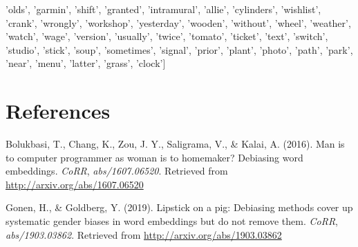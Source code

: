 \documentclass[12pt,]{book}
\newenvironment{Shaded}{\begin{snugshade}}{\end{snugshade}}
\newcommand{\StringTok}[1]{\textcolor[rgb]{0.31,0.60,0.02}{#1}}
\newcommand{\NormalTok}[1]{#1}
\begin{document}
\begin{Shaded}
\begin{Highlighting}[]
                \StringTok{'olds'}\NormalTok{, }\StringTok{'garmin'}\NormalTok{, }\StringTok{'shift'}\NormalTok{, }\StringTok{'granted'}\NormalTok{, }\StringTok{'intramural'}\NormalTok{, }\StringTok{'allie'}\NormalTok{, }\StringTok{'cylinders'}\NormalTok{,}
                \StringTok{'wishlist'}\NormalTok{, }\StringTok{'crank'}\NormalTok{, }\StringTok{'wrongly'}\NormalTok{, }\StringTok{'workshop'}\NormalTok{, }\StringTok{'yesterday'}\NormalTok{, }\StringTok{'wooden'}\NormalTok{, }
                \StringTok{'without'}\NormalTok{, }\StringTok{'wheel'}\NormalTok{, }\StringTok{'weather'}\NormalTok{, }\StringTok{'watch'}\NormalTok{, }\StringTok{'wage'}\NormalTok{, }\StringTok{'version'}\NormalTok{, }\StringTok{'usually'}\NormalTok{,}
                \StringTok{'twice'}\NormalTok{, }\StringTok{'tomato'}\NormalTok{, }\StringTok{'ticket'}\NormalTok{, }\StringTok{'text'}\NormalTok{, }\StringTok{'switch'}\NormalTok{, }\StringTok{'studio'}\NormalTok{, }\StringTok{'stick'}\NormalTok{,}
                \StringTok{'soup'}\NormalTok{, }\StringTok{'sometimes'}\NormalTok{, }\StringTok{'signal'}\NormalTok{, }\StringTok{'prior'}\NormalTok{, }\StringTok{'plant'}\NormalTok{, }\StringTok{'photo'}\NormalTok{,}
                \StringTok{'path'}\NormalTok{, }\StringTok{'park'}\NormalTok{, }\StringTok{'near'}\NormalTok{, }\StringTok{'menu'}\NormalTok{, }\StringTok{'latter'}\NormalTok{, }\StringTok{'grass'}\NormalTok{, }\StringTok{'clock'}\NormalTok{]}
\end{Highlighting}
\end{Shaded}

\normalsize

\chapter*{References}\label{references}

\hypertarget{refs}{}
\hypertarget{ref-Bolukbasi2016Man}{}
Bolukbasi, T., Chang, K., Zou, J. Y., Saligrama, V., \& Kalai, A.
(2016). Man is to computer programmer as woman is to homemaker?
Debiasing word embeddings. \emph{CoRR}, \emph{abs/1607.06520}. Retrieved
from \url{http://arxiv.org/abs/1607.06520}

\hypertarget{ref-Gonen2019Lipstick}{}
Gonen, H., \& Goldberg, Y. (2019). Lipstick on a pig: Debiasing methods
cover up systematic gender biases in word embeddings but do not remove
them. \emph{CoRR}, \emph{abs/1903.03862}. Retrieved from
\url{http://arxiv.org/abs/1903.03862}
\end{document}
